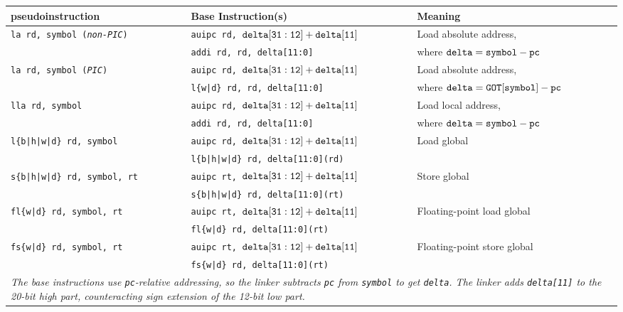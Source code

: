 \begin{table}[h]
\begin{small}
\begin{center}
\begin{tabular}{l l l}
pseudoinstruction & Base Instruction(s) & Meaning \\ \hline

\tt la rd, symbol (\emph{non-PIC}) & {\tt auipc rd, ${\tt delta[31:12]} + {\tt delta[11]}$} & Load absolute address, \\
                  & {\tt addi rd, rd, delta[11:0]}                         & where ${\tt delta} = {\tt symbol} - {\tt pc}$ \\[1ex]
\tt la rd, symbol (\emph{PIC})& {\tt auipc rd, ${\tt delta[31:12]} + {\tt delta[11]}$} & Load absolute address, \\
                  & {\tt l\{w|d\} rd, rd, delta[11:0]}                         & where ${\tt delta} = {\tt GOT[symbol]} - {\tt pc}$ \\[1ex]
\tt lla rd, symbol& {\tt auipc rd, ${\tt delta[31:12]} + {\tt delta[11]}$} & Load local address, \\
                  & {\tt addi rd, rd, delta[11:0]}                         & where ${\tt delta} = {\tt symbol} - {\tt pc}$ \\[1ex]
\tt l\{b|h|w|d\} rd, symbol & {\tt auipc rd, ${\tt delta[31:12]} + {\tt delta[11]}$} & Load global \\
                            & {\tt l\{b|h|w|d\} rd, delta[11:0](rd)}                 & \\[1ex]
\tt s\{b|h|w|d\} rd, symbol, rt & {\tt auipc rt, ${\tt delta[31:12]} + {\tt delta[11]}$} & Store global \\
                               & {\tt s\{b|h|w|d\} rd, delta[11:0](rt)}                 & \\[1ex]
\tt fl\{w|d\} rd, symbol, rt & {\tt auipc rt, ${\tt delta[31:12]} + {\tt delta[11]}$} & Floating-point load global \\
                             & {\tt fl\{w|d\} rd, delta[11:0](rt)}                    & \\[1ex]
\tt fs\{w|d\} rd, symbol, rt & {\tt auipc rt, ${\tt delta[31:12]} + {\tt delta[11]}$} & Floating-point store global \\
                             & {\tt fs\{w|d\} rd, delta[11:0](rt)}                    & \\[1ex]
\multicolumn{3}{p{.99\textwidth}}{\small \em The base instructions use {\tt pc}-relative addressing, so the linker subtracts {\tt pc} from {\tt symbol} to get {\tt delta}.  The linker adds {\tt delta[11]} to the 20-bit high part, counteracting sign extension of the 12-bit low part.} \\

\end{tabular}
\end{center}
\end{small}
\end{table}
